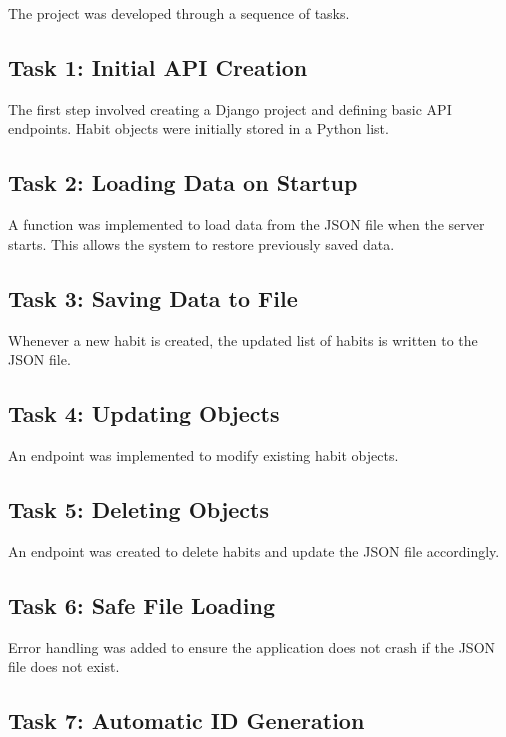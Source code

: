 \documentclass[12pt]{article}
\begin{document}
The project was developed through a sequence of tasks.

\subsection{Task 1: Initial API Creation}

The first step involved creating a Django project and defining basic API endpoints. 
Habit objects were initially stored in a Python list.

\subsection{Task 2: Loading Data on Startup}

A function was implemented to load data from the JSON file when the server starts. 
This allows the system to restore previously saved data.

\subsection{Task 3: Saving Data to File}

Whenever a new habit is created, the updated list of habits is written to the JSON file.

\subsection{Task 4: Updating Objects}

An endpoint was implemented to modify existing habit objects.

\subsection{Task 5: Deleting Objects}

An endpoint was created to delete habits and update the JSON file accordingly.

\subsection{Task 6: Safe File Loading}

Error handling was added to ensure the application does not crash if the JSON file does not exist.

\subsection{Task 7: Automatic ID Generation}
\end{document}
